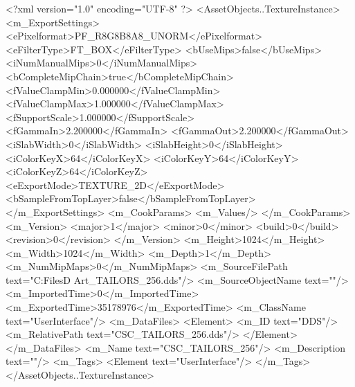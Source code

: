 <?xml version="1.0" encoding="UTF-8" ?>
<AssetObjects..TextureInstance>
	<m_ExportSettings>
		<ePixelformat>PF_R8G8B8A8_UNORM</ePixelformat>
		<eFilterType>FT_BOX</eFilterType>
		<bUseMips>false</bUseMips>
		<iNumManualMips>0</iNumManualMips>
		<bCompleteMipChain>true</bCompleteMipChain>
		<fValueClampMin>0.000000</fValueClampMin>
		<fValueClampMax>1.000000</fValueClampMax>
		<fSupportScale>1.000000</fSupportScale>
		<fGammaIn>2.200000</fGammaIn>
		<fGammaOut>2.200000</fGammaOut>
		<iSlabWidth>0</iSlabWidth>
		<iSlabHeight>0</iSlabHeight>
		<iColorKeyX>64</iColorKeyX>
		<iColorKeyY>64</iColorKeyY>
		<iColorKeyZ>64</iColorKeyZ>
		<eExportMode>TEXTURE_2D</eExportMode>
		<bSampleFromTopLayer>false</bSampleFromTopLayer>
	</m_ExportSettings>
	<m_CookParams>
		<m_Values/>
	</m_CookParams>
	<m_Version>
		<major>1</major>
		<minor>0</minor>
		<build>0</build>
		<revision>0</revision>
	</m_Version>
	<m_Height>1024</m_Height>
	<m_Width>1024</m_Width>
	<m_Depth>1</m_Depth>
	<m_NumMipMaps>0</m_NumMipMaps>
	<m_SourceFilePath text="C:\Users\Shadow\Desktop\Working Files\2D Art\Quarters\Tailors\CSC_TAILORS_256.dds"/>
	<m_SourceObjectName text=""/>
	<m_ImportedTime>0</m_ImportedTime>
	<m_ExportedTime>35178976</m_ExportedTime>
	<m_ClassName text="UserInterface"/>
	<m_DataFiles>
		<Element>
			<m_ID text="DDS"/>
			<m_RelativePath text="CSC_TAILORS_256.dds"/>
		</Element>
	</m_DataFiles>
	<m_Name text="CSC_TAILORS_256"/>
	<m_Description text=""/>
	<m_Tags>
		<Element text="UserInterface"/>
	</m_Tags>
</AssetObjects..TextureInstance>


